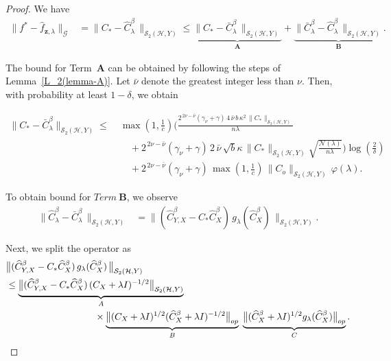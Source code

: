\documentclass[twoside,11pt]{article}
\begin{document}
\begin{proof}
    \noindent
We have
\begin{align*}
\big\|f^*-\widehat{f}_{\textbf{z},\lambda}\big\|_{\mathcal G}
&=
\big\|C_*-\widehat{C}_{\lambda}^\beta\, \big\|_{\mathcal S_2(\mathcal H,Y)} \leq
\underbrace{\big\|C_*-\bar{C}_{\lambda}^\beta\, \big\|_{\mathcal S_2(\mathcal H,Y)}}_{\textbf{A}}  +
\underbrace{\big\|\bar{C}_{\lambda}^\beta -\widehat{C}_\lambda^\beta\, \big\|_{\mathcal S_2(\mathcal H,Y)}}_{\textbf{B}}. 
\end{align*}

\noindent
The bound for Term~\textbf{A} can be obtained by following the steps of
Lemma~\ref{L_2(lemma-A)}. Let $\bar \nu$ denote the greatest integer less than $\nu$.
Then, with probability at least $1-\delta$, we obtain

\[
\begin{aligned}
\big\|C_*-\bar{C}_{\lambda}^\beta\big\|_{\mathcal  S_2(\mathcal H,Y)}
\leq\;&\max\!\left(1,\frac{1}{c}\right)
\Bigg(
\frac{2^{\,2\nu-\bar \nu}(\gamma_\nu+\gamma)\,
      4\,\bar\nu\,b\,\kappa^2\,
      \|C_{*}\|_{\mathcal S_2(\mathcal H,Y)}}{n\lambda}
\\
&\quad
+ 2^{\,2\nu-\bar\nu}(\gamma_\nu+\gamma)\,
      2\,\bar\nu\,\sqrt{b}\kappa\,
      \|C_{*}\|_{\mathcal S_2(\mathcal H,Y)}
      \sqrt{\frac{\mathcal{N}(\lambda)}{n\lambda}}
\Bigg)
\log\!\left(\frac{2}{\delta}\right)
\\
&\quad
+ 2^{\,2\nu-\bar\nu}(\gamma_\nu+\gamma)\,
      \max\!\left(1,\frac{1}{c}\right)\,
      \|C_{o}\|_{\mathcal S_2(\mathcal H,Y)}\,
      \varphi(\lambda).
\end{aligned}
\]



To obtain bound for $Term~$\textbf{B}, we observe
\begin{align*}
\bigl\|  \widehat{C}_\lambda^\beta-\bar{C}_{\lambda}^\beta\,  \bigr\|_{\mathcal  S_2(\mathcal H,Y)}
&=
\bigl\|
( \widehat{C}_{Y,X}^\beta-{C_*}\widehat C_X^\beta)\,
g_\lambda(\widehat{C}_X^\beta)\,
\bigr\|_{\mathcal  S_2(\mathcal H,Y)} .
\end{align*}

\noindent
Next, we split the operator as
\begin{align*}
&\bigl\|
( \widehat{C}_{Y,X}^\beta-{C_*}\widehat C_X^\beta)\,
g_\lambda(\widehat{C}_X^\beta)\,
\bigr\|_{\mathcal S_2(\mathcal H,Y)} \\
&\leq
\underbrace{\bigl\|
( \widehat{C}_{Y,X}^\beta-{C_*}\widehat C_X^\beta)\,
(C_{X}+\lambda I)^{-1/2}
\bigr\|_{\mathcal S_2(\mathcal H,Y)}}_{A}
\\
&\hspace{9.5em}\times
\underbrace{\bigl\|
(C_{X}+\lambda I)^{1/2}
(\widehat{C}^{\beta}_{X}+\lambda I)^{-1/2}
\bigr\|_{op}}_{B}
\;
\underbrace{\bigl\|
(\widehat{C}^{\beta}_{X}+\lambda I)^{1/2}
g_\lambda(\widehat{C}_X^\beta)
\bigr\|_{op}}_{C}.
\end{align*}


\end{proof}
\end{document}
